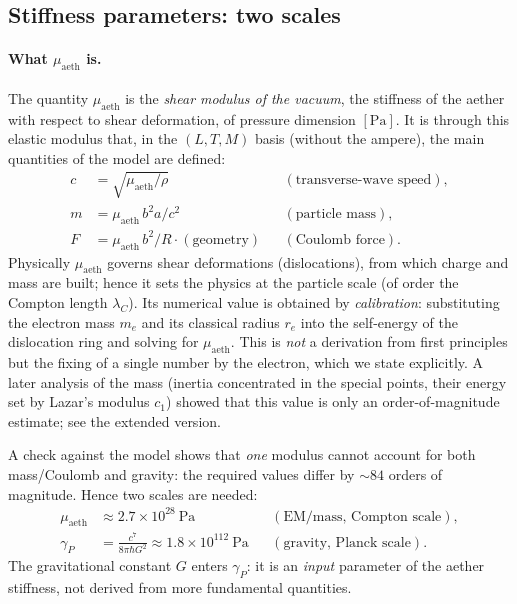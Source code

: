 \documentclass[12pt,a4paper]{article}
\begin{document}
\subsection{Stiffness parameters: two scales}
\paragraph{What $\mu_{\text{aeth}}$ is.}
The quantity $\mu_{\text{aeth}}$ is the \emph{shear modulus of the vacuum}, the
stiffness of the aether with respect to shear deformation, of pressure
dimension $[\text{Pa}]$. It is through this elastic modulus that, in the
$(L,T,M)$ basis (without the ampere), the main quantities of the model are
defined:
\begin{align}
c &= \sqrt{\mu_{\text{aeth}}/\rho} && (\text{transverse-wave speed}),\\
m &= \mu_{\text{aeth}}\,b^2 a / c^2 && (\text{particle mass}),\\
F &= \mu_{\text{aeth}}\,b^2 / R \cdot (\text{geometry}) && (\text{Coulomb force}).
\end{align}
Physically $\mu_{\text{aeth}}$ governs shear deformations (dislocations), from
which charge and mass are built; hence it sets the physics at the particle
scale (of order the Compton length $\lambda_C$). Its numerical value is
obtained by \emph{calibration}: substituting the electron mass $m_e$ and its
classical radius $r_e$ into the self-energy of the dislocation ring and solving
for $\mu_{\text{aeth}}$. This is \emph{not} a derivation from first principles
but the fixing of a single number by the electron, which we state explicitly. A later
analysis of the mass (inertia concentrated in the special points, their energy set by
Lazar's modulus $c_1$) showed that this value is only an order-of-magnitude estimate;
see the extended version.

A check against the model shows that \emph{one} modulus cannot account for both
mass/Coulomb and gravity: the required values differ by $\sim\!84$ orders of
magnitude. Hence two scales are needed:
\begin{align}
\mu_{\text{aeth}} &\approx 2.7\times10^{28}~\text{Pa} && (\text{EM/mass, Compton scale}),\\
\gamma_P &= \frac{c^7}{8\pi\hbar G^2}\approx 1.8\times10^{112}~\text{Pa} && (\text{gravity, Planck scale}).
\end{align}
The gravitational constant $G$ enters $\gamma_P$: it is an \emph{input}
parameter of the aether stiffness, not derived from more fundamental quantities.
\end{document}
